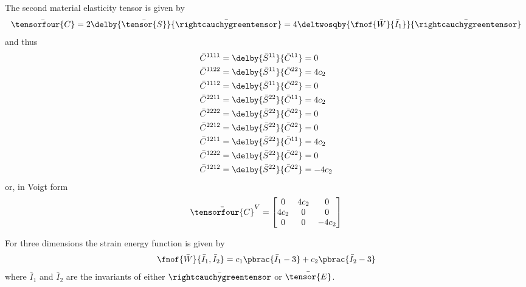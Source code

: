 The second material elasticity tensor is given by
\begin{equation}
  \bar{\tensorfour{C}}=2\delby{\bar{\tensor{S}}}{\bar{\rightcauchygreentensor}}=4\deltwosqby{\fnof{\bar{W}}{\bar{I}_{1}}}{\bar{\rightcauchygreentensor}}\\
\end{equation}
and thus
\begin{equation}
  \begin{split}
    \bar{C}^{1111}&=\delby{\bar{S}^{11}}{\bar{C}^{11}}=0\\
    \bar{C}^{1122}&=\delby{\bar{S}^{11}}{\bar{C}^{22}}=4c_{2}\\
    \bar{C}^{1112}&=\delby{\bar{S}^{11}}{\bar{C}^{22}}=0\\
    \bar{C}^{2211}&=\delby{\bar{S}^{22}}{\bar{C}^{11}}=4c_{2}\\
    \bar{C}^{2222}&=\delby{\bar{S}^{22}}{\bar{C}^{22}}=0\\
    \bar{C}^{2212}&=\delby{\bar{S}^{22}}{\bar{C}^{22}}=0\\
    \bar{C}^{1211}&=\delby{\bar{S}^{22}}{\bar{C}^{11}}=4c_{2}\\
    \bar{C}^{1222}&=\delby{\bar{S}^{22}}{\bar{C}^{22}}=0\\
    \bar{C}^{1212}&=\delby{\bar{S}^{22}}{\bar{C}^{22}}=-4c_{2}\\
  \end{split}
\end{equation}
or, in Voigt form
\begin{equation}
  \bar{\tensorfour{C}}^{V}=\begin{bmatrix}
  0 & 4c_{2} & 0 \\
  4c_{2} & 0 & 0 \\
  0 & 0 & -4c_{2}
  \end{bmatrix}
\end{equation}

For three dimensions the strain energy function is given by
\begin{equation}
  \fnof{\bar{W}}{\bar{I}_{1},\bar{I}_{2}}=c_{1}\pbrac{\bar{I}_{1}-3}+c_{2}\pbrac{\bar{I}_{2}-3}
\end{equation}
where $\bar{I}_{1}$ and $\bar{I}_{2}$ are the invariants of either $\bar{\rightcauchygreentensor}$ or $\bar{\tensor{E}}$.

